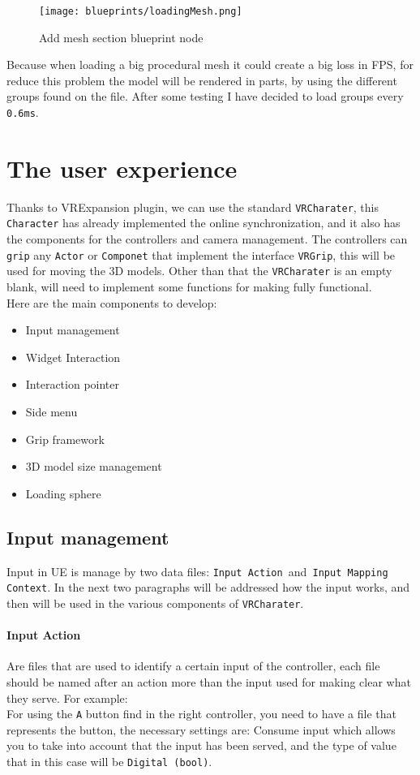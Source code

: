 \begin{figure}[h]
    \centering
    \texttt{[image: blueprints/loadingMesh.png]}
    \caption{Add mesh section blueprint node}
    \label{fig:loadingMesh}
\end{figure}
\noindent
Because when loading a big procedural mesh it could create a big loss in \ac{FPS}, for reduce this problem the model will be rendered in parts, by using the different groups found on the file. After some testing I have decided to load groups every \verb|0.6ms|. 

\section{The user experience}
\noindent
Thanks to VRExpansion plugin, we can use the standard \verb|VRCharater|, this \verb*|Character| has already implemented the online synchronization, and it also has the components for the controllers and camera management.
The controllers can \verb|grip| any \verb|Actor| or \verb|Componet| that implement the interface \verb|VRGrip|, this will be used for  moving the 3D models.
Other than that the \verb|VRCharater| is an empty blank, will need to implement some functions for making fully functional.\\
Here are the main components to develop:

\begin{itemize}
    \item Input management
    \item Widget Interaction
    \item Interaction pointer
    \item Side menu
    \item Grip framework
    \item 3D model size management    
    \item Loading sphere
\end{itemize}

\subsection{Input management}
\noindent
Input in \ac{UE} is manage by two data files: \verb|Input Action |and\verb| Input Mapping Context|.
In the next two paragraphs will be addressed how the input works, and then will be used in the various components of \verb|VRCharater|.

\paragraph{Input Action}
Are files that are used to identify a certain input of the controller, each file should be named after an action more than the input used for making clear what they serve.
For example:\\
For using the \verb|A| button find in the right controller,
you need to have a file that represents the button,
the necessary settings are: Consume input which allows you to take into account that the input has been served,
and the type of value that in this case will be \verb|Digital (bool)|.

